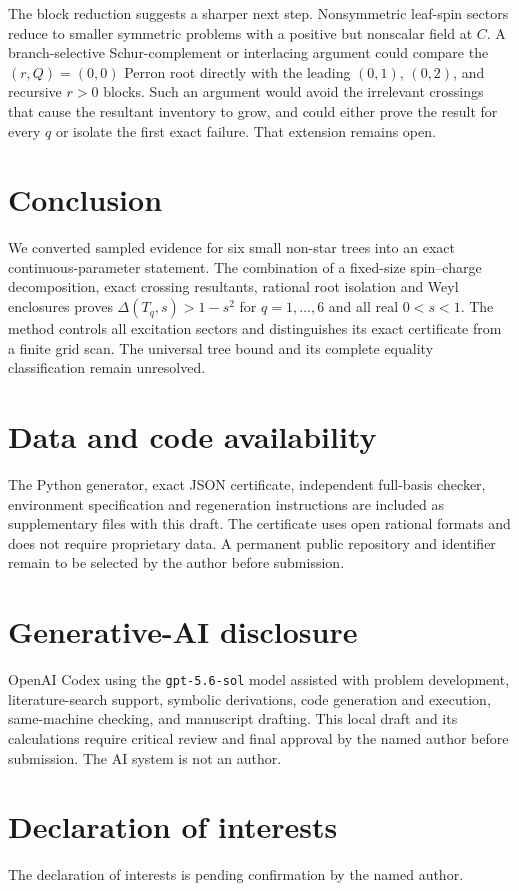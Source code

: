 \documentclass[11pt]{article}
\begin{document}
The block reduction suggests a sharper next step.  Nonsymmetric leaf-spin
sectors reduce to smaller symmetric problems with a positive but nonscalar
field at \(C\).  A branch-selective Schur-complement or interlacing argument
could compare the \((r,Q)=(0,0)\) Perron root directly with the leading
\((0,1)\), \((0,2)\), and recursive \(r>0\) blocks.  Such an argument would
avoid the irrelevant crossings that cause the resultant inventory to grow,
and could either prove the result for every \(q\) or isolate the first exact
failure.  That extension remains open.

\section{Conclusion}

We converted sampled evidence for six small non-star trees into an exact
continuous-parameter statement.  The combination of a fixed-size
spin--charge decomposition, exact crossing resultants, rational root
isolation and Weyl enclosures proves
\(\Delta(T_q,s)>1-s^2\) for \(q=1,\ldots,6\) and all real \(0<s<1\).
The method controls all excitation sectors and distinguishes its exact
certificate from a finite grid scan.  The universal tree bound and its
complete equality classification remain unresolved.

\section*{Data and code availability}

The Python generator, exact JSON certificate, independent full-basis
checker, environment specification and regeneration instructions are
included as supplementary files with this draft.  The certificate uses
open rational formats and does not require proprietary data.  A permanent
public repository and identifier remain to be selected by the author before
submission.

\section*{Generative-AI disclosure}

OpenAI Codex using the \texttt{gpt-5.6-sol} model assisted with problem
development, literature-search support, symbolic derivations, code
generation and execution, same-machine checking, and manuscript drafting.
This local draft and its calculations require critical review and final
approval by the named author before submission.  The AI system is not an
author.

\section*{Declaration of interests}

The declaration of interests is pending confirmation by the named author.



\end{document}

